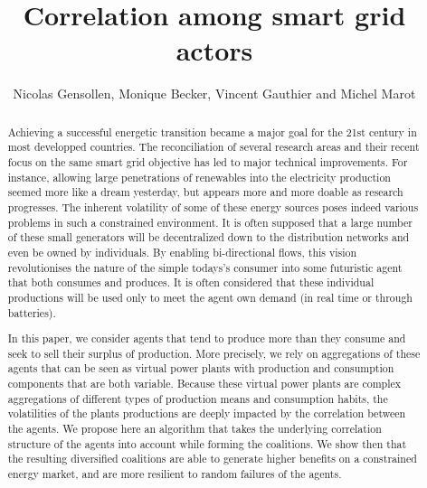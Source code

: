 \documentclass[conference]{IEEEtran}
\begin{document}
%
%
\title{Correlation among smart grid actors}

%
%
\author{Nicolas Gensollen, Monique Becker, Vincent Gauthier and Michel Marot  \\
}

\maketitle

%
%
\begin{abstract}
Achieving a successful energetic transition became a major goal for the 21st century in most developped countries. The reconciliation of several research areas and their recent focus on the same smart grid objective has led to major technical improvements. For instance, allowing large penetrations of renewables into the electricity production seemed more like a dream yesterday, but appears more and more doable as research progresses. The inherent volatility of some of these energy sources poses indeed various problems in such a constrained environment. It is often supposed that a large number of these small generators will be decentralized down to the distribution networks and even be owned by individuals. By enabling bi-directional flows, this vision revolutionises the nature of the simple todays's consumer into some futuristic agent that both consumes and produces. It is often considered that these individual productions will be used only to meet the agent own demand (in real time or through batteries). 

In this paper, we consider agents that tend to produce more than they consume and seek to sell their surplus of production. More precisely, we rely on aggregations of these agents that can be seen as virtual power plants with production and consumption components that are both variable. Because these virtual power plants are complex aggregations of different types of production means and consumption habits, the volatilities of the plants productions are deeply impacted by the correlation between the agents. We propose here an algorithm that takes the underlying correlation structure of the agents into account while forming the coalitions. We show then that the resulting diversified coalitions are able to generate higher benefits on a constrained energy market, and are more resilient to random failures of the agents.
\end{abstract}
\end{document}
